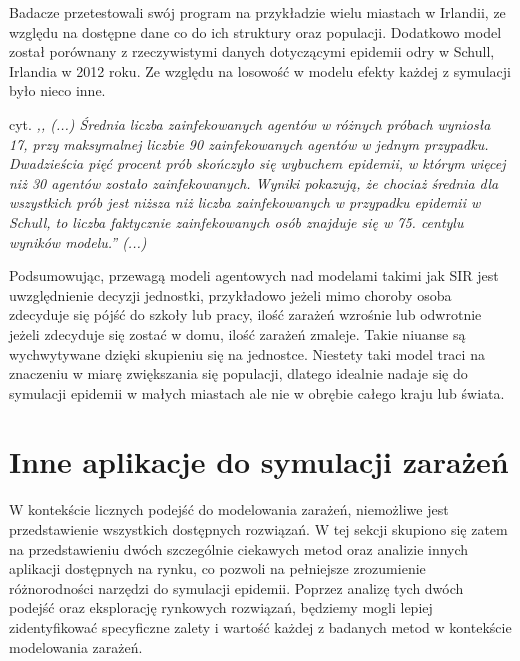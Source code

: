 Badacze przetestowali swój program na przykładzie wielu miastach w Irlandii, ze względu na dostępne dane co do ich struktury oraz populacji.
Dodatkowo model został porównany z rzeczywistymi danych dotyczącymi epidemii odry w Schull, Irlandia w 2012 roku. Ze względu na losowość w modelu efekty każdej z symulacji było nieco inne. 

cyt. \textit{,, (...) Średnia liczba zainfekowanych agentów w różnych próbach wyniosła 17, przy maksymalnej liczbie 90 zainfekowanych agentów w jednym przypadku. Dwadzieścia pięć procent prób skończyło się wybuchem epidemii, w którym więcej niż 30 agentów zostało zainfekowanych. Wyniki pokazują, że chociaż średnia dla wszystkich prób jest niższa niż liczba zainfekowanych w przypadku epidemii w Schull, to liczba faktycznie zainfekowanych osób znajduje się w 75. centylu wyników modelu.'' (...)} \cite{bib:artykul1}

Podsumowując, przewagą modeli agentowych nad modelami takimi jak SIR jest uwzględnienie decyzji jednostki, przykładowo jeżeli mimo choroby osoba zdecyduje się pójść do szkoły lub pracy, ilość zarażeń wzrośnie lub odwrotnie jeżeli zdecyduje się zostać w domu, ilość zarażeń zmaleje. Takie niuanse są wychwytywane dzięki skupieniu się na jednostce. Niestety taki model traci na znaczeniu w miarę zwiększania się populacji, dlatego idealnie nadaje się do symulacji epidemii w małych miastach ale nie w obrębie całego kraju lub świata.

\section{\textbf{Inne aplikacje do symulacji zarażeń}}

W kontekście licznych podejść do modelowania zarażeń, niemożliwe jest przedstawienie wszystkich dostępnych rozwiązań. W tej sekcji skupiono się zatem na przedstawieniu dwóch szczególnie ciekawych metod oraz analizie innych aplikacji dostępnych na rynku, co pozwoli na pełniejsze zrozumienie różnorodności narzędzi do symulacji epidemii. Poprzez analizę tych dwóch podejść oraz eksplorację rynkowych rozwiązań, będziemy mogli lepiej zidentyfikować specyficzne zalety i wartość każdej z badanych metod w kontekście modelowania zarażeń.


